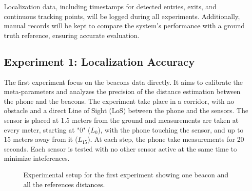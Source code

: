 Localization data, including timestamps for detected entries, exits, and continuous tracking points, will be logged during all experiments. Additionally, manual records will be kept to compare the system's performance with a ground truth reference, ensuring accurate evaluation.

\subsection{Experiment 1: Localization Accuracy}
\label{exp:1_accuracy}

The first experiment focus on the beacons data directly. It aims to calibrate the meta-parameters and analyzes the precision of the distance estimation between the phone and the beacons. The experiment take place in a corridor, with no obstacle and a direct Line of Sight (LoS) between the phone and the sensors. The sensor is placed at 1.5 meters from the ground and measurements are taken at every meter, starting at "0" ($L_0$), with the phone touching the sensor, and up to 15 meters away from it ($L_{15}$). At each step, the phone take measurements for 20 seconds. Each sensor is tested with no other sensor active at the same time to minimize inteferences.

\begin{figure}[H]
    \centering
    \caption{Experimental setup for the first experiment showing one beacon and all the references distances.}
    \label{fig:exp1_setup}
\end{figure}

